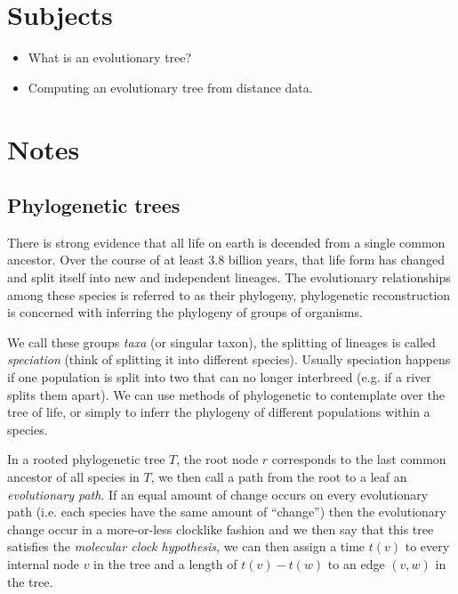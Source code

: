 


    \section{Subjects}
    \begin{itemize}
        \item What is an evolutionary tree?
        \item Computing an evolutionary tree from distance data.
    \end{itemize}
    
    \section{Notes}
    
    \subsection{Phylogenetic trees}
    There is strong evidence that all life on earth is decended from a single 
    common ancestor. Over the course of at least 3.8 billion years, that life 
    form has changed and split itself into new and independent lineages. The 
    evolutionary relationships among these species is referred to as their 
    phylogeny, phylogenetic reconstruction is concerned with inferring the 
    phylogeny of groups of organisms.
    
    We call these groups \textit{taxa} (or singular taxon), the splitting of 
    lineages is called \textit{speciation} (think of splitting it into 
    different species). Usually speciation happens if one population is split 
    into two that can no longer interbreed (e.g. if a river splits them apart). 
    We can use methods of phylogenetic to contemplate over the tree of life, or 
    simply to inferr the phylogeny of different populations within a species.
    
    In a rooted phylogenetic tree $T$, the root node $r$ corresponds to the 
    last common ancestor of all species in $T$, we then call a path from the 
    root to a leaf an \textit{evolutionary path}. If an equal amount of change 
    occurs on every evolutionary path (i.e. each species have the same amount 
    of ``change'') then the evolutionary change occur in a more-or-less 
    clocklike fashion and we then say that this tree satisfies the 
    \textit{molecular clock hypothesis}, we can then assign a time $t(v)$ to 
    every internal node $v$ in the tree and a length of $t(v)-t(w)$ to an edge 
    $(v,w)$ in the tree.
    
